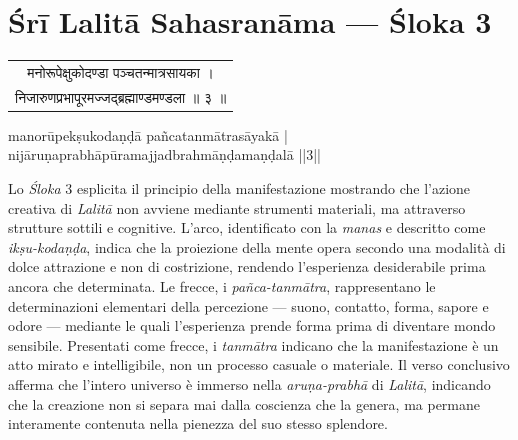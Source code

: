 \chapter*{Śrī Lalitā Sahasranāma — Śloka 3}

\begin{sloka}
{\sanskritfont
\begin{tabular}{c}
मनोरूपेक्षुकोदण्डा पञ्चतन्मात्रसायका ।\\
निजारुणप्रभापूरमज्जद्ब्रह्माण्डमण्डला ॥ ३ ॥
\end{tabular}

\vspace{1.5em}

{\middlesize \iastfont
manorūpekṣukodaṇḍā pañcatanmātrasāyakā |\\
nijāruṇaprabhāpūramajjadbrahmāṇḍamaṇḍalā ||3||}

\vspace{1em}

{\middlesize
{}
}

\middlesize \iastfont {}

}
\end{sloka}


Lo \textit{Śloka} 3 esplicita il principio della manifestazione mostrando che l’azione creativa di \textit{Lalitā} non avviene mediante strumenti materiali, ma attraverso strutture sottili e cognitive. L’arco, identificato con la \textit{manas} e descritto come \textit{ikṣu-kodaṇḍa}, indica che la proiezione della mente opera secondo una modalità di dolce attrazione e non di costrizione, rendendo l’esperienza desiderabile prima ancora che determinata. Le frecce, i \textit{pañca-tanmātra}, rappresentano le determinazioni elementari della percezione — suono, contatto, forma, sapore e odore — mediante le quali l’esperienza prende forma prima di diventare mondo sensibile. Presentati come frecce, i \textit{tanmātra} indicano che la manifestazione è un atto mirato e intelligibile, non un processo casuale o materiale. Il verso conclusivo afferma che l’intero universo è immerso nella \textit{aruṇa-prabhā} di \textit{Lalitā}, indicando che la creazione non si separa mai dalla coscienza che la genera, ma permane interamente contenuta nella pienezza del suo stesso splendore.

